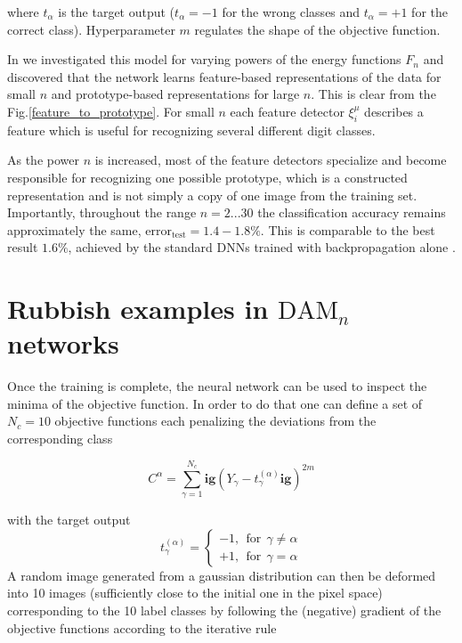 where $t_\alpha$ is the target output ($t_\alpha=-1$ for the wrong classes and $t_\alpha=+1$ for the correct class). Hyperparameter $m$ regulates the shape of the objective function.  

 In \cite{Krotov Hopfield} we investigated this model for varying powers of the energy functions $F_n$ and discovered that the network learns feature-based representations of the data for small $n$ and prototype-based representations for large $n$. This is clear from the Fig.\ref{feature_to_prototype}. For small $n$ each feature detector $\xi^\mu_i$ describes a feature which is useful for recognizing several different digit classes. 

As the power $n$ is increased, most of the feature detectors specialize and become responsible for recognizing one possible prototype, which is a constructed representation and is not simply a copy of one image from the training set. Importantly, throughout the range $n=2...30$ the classification accuracy remains approximately the same, $\text{error}_{\text{test}}=1.4 - 1.8\%$. This is comparable to the best result $1.6\%$, achieved by the standard DNNs trained with backpropagation alone \cite{Platt}. 

\section{Rubbish examples in $\text{DAM}_n$ networks} Once the training is complete, the neural network can be used to inspect the minima of the objective function. In order to do that one can define a set of $N_c=10$ objective functions each penalizing the deviations from the corresponding class

\begin{equation}
C^\alpha=\sum\limits_{\gamma=1}^{N_c} \mathbf{ig}(Y_\gamma - t_\gamma^{(\alpha)}\mathbf{ig})^{2m}
\end{equation}

with the target output $$
t_\gamma^{(\alpha)}=

\begin{cases} -1, \ \ \text{for}\ \  \gamma \neq \alpha\\
+1,  \ \ \text{for}\ \  \gamma=\alpha
\end{cases}

$$ A random image generated from a gaussian distribution can then be deformed into 10 images (sufficiently close to the initial one in the pixel space) corresponding to the 10 label classes by following the (negative) gradient of the objective functions according to the iterative rule

